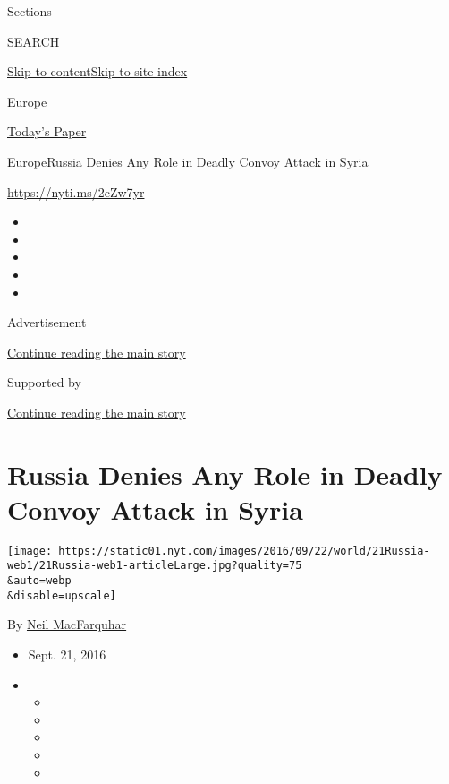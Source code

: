 Sections

SEARCH

\protect\hyperlink{site-content}{Skip to
content}\protect\hyperlink{site-index}{Skip to site index}

\href{https://www.nytimes.com/section/world/europe}{Europe}

\href{https://myaccount.nytimes.com/auth/login?response_type=cookie\&client_id=vi}{}

\href{https://www.nytimes.com/section/todayspaper}{Today's Paper}

\href{/section/world/europe}{Europe}\textbar{}Russia Denies Any Role in
Deadly Convoy Attack in Syria

\url{https://nyti.ms/2cZw7yr}

\begin{itemize}
\item
\item
\item
\item
\item
\end{itemize}

Advertisement

\protect\hyperlink{after-top}{Continue reading the main story}

Supported by

\protect\hyperlink{after-sponsor}{Continue reading the main story}

\hypertarget{russia-denies-any-role-in-deadly-convoy-attack-in-syria}{%
\section{Russia Denies Any Role in Deadly Convoy Attack in
Syria}\label{russia-denies-any-role-in-deadly-convoy-attack-in-syria}}

\texttt{[image: https://static01.nyt.com/images/2016/09/22/world/21Russia-web1/21Russia-web1-articleLarge.jpg?quality=75\\\&auto=webp\\\&disable=upscale]}

By \href{http://www.nytimes.com/by/neil-macfarquhar}{Neil MacFarquhar}

\begin{itemize}
\item
  Sept. 21, 2016
\item
  \begin{itemize}
  \item
  \item
  \item
  \item
  \item
  \end{itemize}
\end{itemize}

